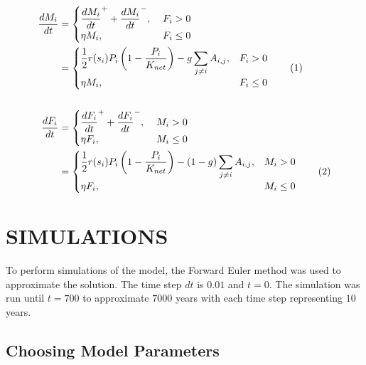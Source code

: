 \documentclass[letterpaper, 9pt, conference]{ieeeconf}  %
\newcommand\numberthis{\addtocounter{equation}{1}\tag{\theequation}}
\begin{document}
\begin{align*}
    \frac{dM_i}{dt} 
    & =\begin{cases} 
        \dfrac{dM_i}{dt}^{+} + \dfrac{dM_i}{dt}^{-}, & \; F_i > 0 \\
        \eta M_i, & \; F_i \leq 0 \\
    \end{cases} \\
    & = \begin{cases}
        \dfrac{1}{2}r(s_i)P_i\left(1 - \dfrac{P_i}{K_{net}}\right) - g\displaystyle\sum\limits_{j \neq i} A_{i,j}, & F_i > 0 \\
        \eta M_i, & F_i \leq 0 %
    \end{cases} \numberthis \label{eq:10}\\
    \;\\
    \frac{dF_i}{dt}
    & =\begin{cases} 
        \dfrac{dF_i}{dt}^{+} + \dfrac{dF_i}{dt}^{-}, & \; M_i > 0 \\
        \eta F_i, & \; M_i \leq 0 \\
    \end{cases} \\
    & = \begin{cases}
        \dfrac{1}{2}r(s_i)P_i\left(1 - \dfrac{P_i}{K_{net}}\right) - \left(1-g\right)\displaystyle\sum\limits_{j \neq i} A_{i,j}, & M_i > 0 \\
        \eta F_i, & M_i \leq 0 \\
    \end{cases}
    \numberthis \label{eq:11}
\end{align*}



\section{SIMULATIONS}
To perform simulations of the model, the Forward Euler method \cite{euler_method} was used to approximate the solution. The time step $dt$ is $0.01$ and $t = 0$. The simulation was run until $t = 700$ to approximate $7000$ years with each time step representing $10$ years.

\subsection{Choosing Model Parameters}
\end{document}

